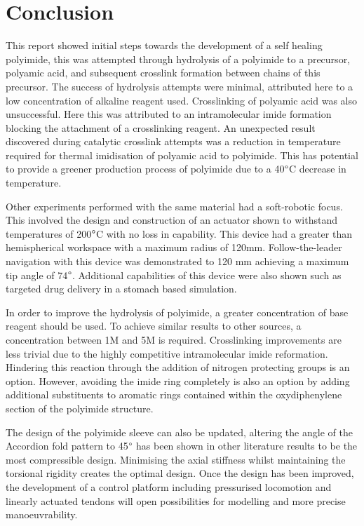 \chapter{Conclusion} %
\label{cha:conclusion}

This report showed initial steps towards the development of a self healing polyimide, this was attempted through hydrolysis of a polyimide to a precursor, polyamic acid, and subsequent crosslink formation between chains of this precursor. The success of hydrolysis attempts were minimal, attributed here to a low concentration of alkaline reagent used. Crosslinking of polyamic acid was also unsuccessful. Here this was attributed to an intramolecular imide formation blocking the attachment of a crosslinking reagent. An unexpected result discovered during catalytic crosslink attempts was a reduction in temperature required for thermal imidisation of polyamic acid to polyimide. This has potential to provide a greener production process of polyimide due to a 40$\degree$C decrease in temperature.

Other experiments performed with the same material had a soft-robotic focus. This involved the design and construction of an actuator shown to withstand temperatures of 200$\degree$C with no loss in capability. This device had a greater than hemispherical workspace with a maximum radius of 120mm. Follow-the-leader navigation with this device was demonstrated to 120 mm achieving a maximum tip angle of 74$\degree$. Additional capabilities of this device were also shown such as targeted drug delivery in a stomach based simulation.


In order to improve the hydrolysis of polyimide, a greater concentration of base reagent should be used. To achieve similar results to other sources, a concentration between 1M and 5M is required. Crosslinking improvements are less trivial due to the highly competitive intramolecular imide reformation. Hindering this reaction through the addition of nitrogen protecting groups is an option. However, avoiding the imide ring completely is also an option by adding additional substituents to aromatic rings contained within the oxydiphenylene section of the polyimide structure.  

The design of the polyimide sleeve can also be updated, altering the angle of the Accordion fold pattern to 45$\degree$ has been shown in other literature results to be the most compressible design. Minimising the axial stiffness whilst maintaining the torsional rigidity creates the optimal design. Once the design has been improved, the development of a control platform including pressurised locomotion and linearly actuated tendons will open possibilities for modelling and more precise manoeuvrability. 

